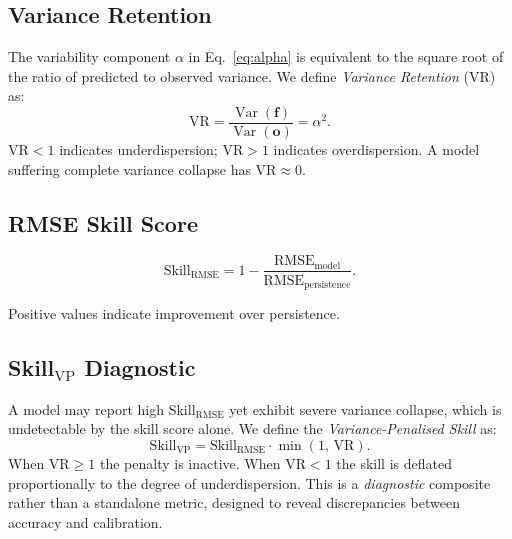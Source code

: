 \documentclass[11pt,a4paper]{article}
\begin{document}
\subsection{Variance Retention}\label{sec:vr}

The variability component $\alpha$ in Eq.~\eqref{eq:alpha} is equivalent
to the square root of the ratio of predicted to observed variance.
We define \emph{Variance Retention} (VR) as:
\begin{equation}
  \mathrm{VR} = \frac{\operatorname{Var}(\mathbf{f})}{\operatorname{Var}(\mathbf{o})}
               = \alpha^2.
  \label{eq:vr}
\end{equation}
VR$<1$ indicates underdispersion; VR$>1$ indicates overdispersion.
A model suffering complete variance collapse has VR$\approx 0$.

\subsection{RMSE Skill Score}\label{sec:skill}

\begin{equation}
  \mathrm{Skill}_{\mathrm{RMSE}} = 1 - \frac{\mathrm{RMSE}_{\mathrm{model}}}
                                            {\mathrm{RMSE}_{\mathrm{persistence}}}.
  \label{eq:skill}
\end{equation}

Positive values indicate improvement over persistence.

\subsection{Skill$_{\mathrm{VP}}$ Diagnostic}\label{sec:skillvp}

A model may report high Skill$_{\mathrm{RMSE}}$ yet exhibit severe variance
collapse, which is undetectable by the skill score alone.
We define the \emph{Variance-Penalised Skill} as:
\begin{equation}
  \mathrm{Skill}_{\mathrm{VP}} = \mathrm{Skill}_{\mathrm{RMSE}}
                                 \cdot \min(1,\,\mathrm{VR}).
  \label{eq:skillvp}
\end{equation}
When VR$\ge 1$ the penalty is inactive.
When VR$<1$ the skill is deflated proportionally to the degree of
underdispersion.
This is a \emph{diagnostic} composite rather than a standalone metric,
designed to reveal discrepancies between accuracy and calibration.

\end{document}

